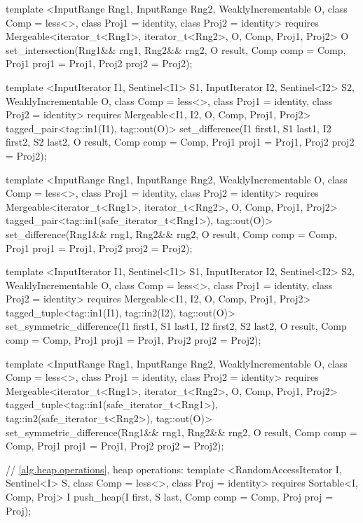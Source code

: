 \begin{codeblock}
{{{{  template <InputRange Rng1, InputRange Rng2, WeaklyIncrementable O,
      class Comp = less<>, class Proj1 = identity, class Proj2 = identity>
    requires Mergeable<iterator_t<Rng1>, iterator_t<Rng2>, O, Comp, Proj1, Proj2>
    O
      set_intersection(Rng1&& rng1, Rng2&& rng2, O result,
                       Comp comp = Comp{}, Proj1 proj1 = Proj1{}, Proj2 proj2 = Proj2{});

  template <InputIterator I1, Sentinel<I1> S1, InputIterator I2, Sentinel<I2> S2,
      WeaklyIncrementable O, class Comp = less<>, class Proj1 = identity, class Proj2 = identity>
    requires Mergeable<I1, I2, O, Comp, Proj1, Proj2>
    tagged_pair<tag::in1(I1), tag::out(O)>
      set_difference(I1 first1, S1 last1, I2 first2, S2 last2, O result,
                     Comp comp = Comp{}, Proj1 proj1 = Proj1{}, Proj2 proj2 = Proj2{});

  template <InputRange Rng1, InputRange Rng2, WeaklyIncrementable O,
      class Comp = less<>, class Proj1 = identity, class Proj2 = identity>
    requires Mergeable<iterator_t<Rng1>, iterator_t<Rng2>, O, Comp, Proj1, Proj2>
    tagged_pair<tag::in1(safe_iterator_t<Rng1>), tag::out(O)>
      set_difference(Rng1&& rng1, Rng2&& rng2, O result,
                     Comp comp = Comp{}, Proj1 proj1 = Proj1{}, Proj2 proj2 = Proj2{});

  template <InputIterator I1, Sentinel<I1> S1, InputIterator I2, Sentinel<I2> S2,
      WeaklyIncrementable O, class Comp = less<>, class Proj1 = identity, class Proj2 = identity>
    requires Mergeable<I1, I2, O, Comp, Proj1, Proj2>
    tagged_tuple<tag::in1(I1), tag::in2(I2), tag::out(O)>
      set_symmetric_difference(I1 first1, S1 last1, I2 first2, S2 last2, O result,
                               Comp comp = Comp{}, Proj1 proj1 = Proj1{},
                               Proj2 proj2 = Proj2{});

  template <InputRange Rng1, InputRange Rng2, WeaklyIncrementable O,
      class Comp = less<>, class Proj1 = identity, class Proj2 = identity>
    requires Mergeable<iterator_t<Rng1>, iterator_t<Rng2>, O, Comp, Proj1, Proj2>
    tagged_tuple<tag::in1(safe_iterator_t<Rng1>),
                 tag::in2(safe_iterator_t<Rng2>),
                 tag::out(O)>
      set_symmetric_difference(Rng1&& rng1, Rng2&& rng2, O result, Comp comp = Comp{},
                               Proj1 proj1 = Proj1{}, Proj2 proj2 = Proj2{});

  // \ref{alg.heap.operations}, heap operations:
  template <RandomAccessIterator I, Sentinel<I> S, class Comp = less<>,
      class Proj = identity>
    requires Sortable<I, Comp, Proj>
    I push_heap(I first, S last, Comp comp = Comp{}, Proj proj = Proj{});

}}}}
\end{codeblock}
